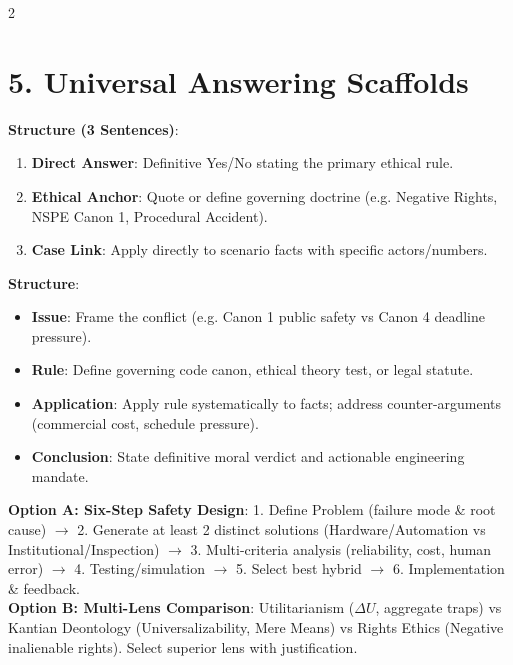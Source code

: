 \documentclass[9pt,a4paper]{extarticle}
\begin{document}
\begin{multicols}{2}
\section{5. Universal Answering Scaffolds}

\begin{tcolorbox}[compact,colframe=secondary,title={Scaffold 1: 2--4 Mark Questions (2--4 Min)}]
\textbf{Structure (3 Sentences)}:
\begin{enumerate}[leftmargin=10pt]
  \item \textbf{Direct Answer}: Definitive Yes/No stating the primary ethical rule.
  \item \textbf{Ethical Anchor}: Quote or define governing doctrine (e.g. Negative Rights, NSPE Canon 1, Procedural Accident).
  \item \textbf{Case Link}: Apply directly to scenario facts with specific actors/numbers.
\end{enumerate}
\end{tcolorbox}

\begin{tcolorbox}[compact,colframe=secondary,title={Scaffold 2: 5--8 Mark Questions (IRAC, 5--8 Min)}]
\textbf{Structure}:
\begin{itemize}[leftmargin=9pt]
  \item \textbf{Issue}: Frame the conflict (e.g. Canon 1 public safety vs Canon 4 deadline pressure).
  \item \textbf{Rule}: Define governing code canon, ethical theory test, or legal statute.
  \item \textbf{Application}: Apply rule systematically to facts; address counter-arguments (commercial cost, schedule pressure).
  \item \textbf{Conclusion}: State definitive moral verdict and actionable engineering mandate.
\end{itemize}
\end{tcolorbox}

\begin{tcolorbox}[compact,colframe=primary,title={Scaffold 3: 10--12 Mark Questions (10--12 Min)}]
\textbf{Option A: Six-Step Safety Design}:
1. Define Problem (failure mode \& root cause) $\rightarrow$ 2. Generate at least 2 distinct solutions (Hardware/Automation vs Institutional/Inspection) $\rightarrow$ 3. Multi-criteria analysis (reliability, cost, human error) $\rightarrow$ 4. Testing/simulation $\rightarrow$ 5. Select best hybrid $\rightarrow$ 6. Implementation \& feedback.\\
\textbf{Option B: Multi-Lens Comparison}:
Utilitarianism ($\Delta U$, aggregate traps) vs Kantian Deontology (Universalizability, Mere Means) vs Rights Ethics (Negative inalienable rights). Select superior lens with justification.
\end{tcolorbox}


\end{multicols}
\end{document}
